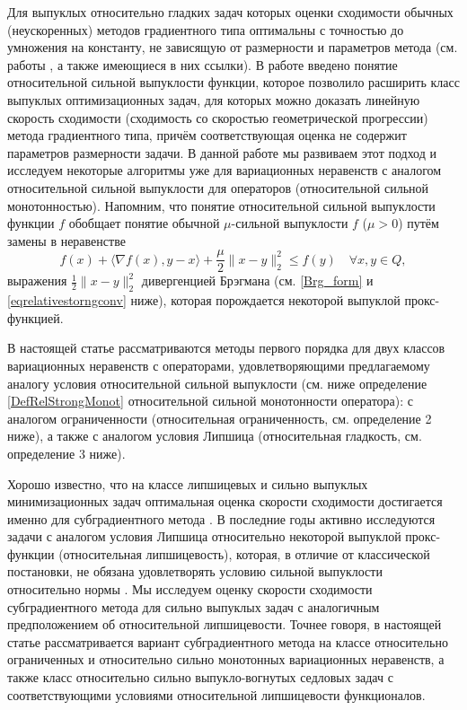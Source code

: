     Для выпуклых относительно гладких задач которых оценки сходимости обычных (неускоренных) методов градиентного типа оптимальны с точностью до умножения на константу, не зависящую от размерности и параметров метода (см. работы \cite{Bauschke,Drag,Dragomir,Lu_Nesterov_2018}, а также имеющиеся в них ссылки). В работе \cite{Lu_Nesterov_2018} введено понятие относительной сильной выпуклости функции, которое позволило расширить класс выпуклых оптимизационных задач, для которых можно доказать линейную скорость сходимости (сходимость со скоростью геометрической прогрессии) метода градиентного типа, причём соответствующая оценка не содержит параметров размерности задачи. В данной работе мы развиваем этот подход и исследуем некоторые алгоритмы уже для вариационных неравенств с аналогом относительной сильной выпуклости для операторов (относительной сильной монотонностью). Напомним, что понятие относительной сильной выпуклости \cite{Lu_Nesterov_2018} функции $f$ обобщает понятие обычной $\mu$-сильной выпуклости $f$ ($\mu > 0$) путём замены в неравенстве 
    \begin{equation}
    	f(x) + \langle \nabla{f(x)}, y - x \rangle  + \frac{\mu}{2} \|x - y \|_2^2 \leq f(y) \quad   \forall x, y \in Q,
    	\end{equation}
    выражения $\frac{1}{2} \|x - y \|_2^2 $ дивергенцией Брэгмана (см. \eqref{Brg_form} и \eqref{eqrelativestorngconv} ниже), которая порождается некоторой выпуклой прокс-функцией. 

    В настоящей статье рассматриваются методы первого порядка для двух классов вариационных неравенств с операторами, удовлетворяющими предлагаемому аналогу условия относительной сильной выпуклости (см. ниже определение  \ref{DefRelStrongMonot} относительной сильной монотонности оператора): с аналогом ограниченности (относительная ограниченность, см. определение 2 ниже), а также с аналогом условия Липшица (относительная гладкость, см. определение 3 ниже).

    Хорошо известно, что на классе липшицевых и сильно выпуклых минимизационных задач оптимальная оценка скорости сходимости достигается именно для субградиентного метода \cite{Bach_2012}. В последние годы активно исследуются задачи с аналогом условия Липшица относительно некоторой выпуклой прокс-функции (относительная липшицевость), которая, в отличие от классической постановки, не обязана удовлетворять условию сильной выпуклости относительно нормы \cite{AdaMirr_2021,Lu_2018,Zhou_NIPS_2020}. Мы исследуем оценку скорости сходимости субградиентного метода для сильно выпуклых задач с аналогичным предположением об относительной липшицевости. Точнее говоря, в настоящей статье рассматривается вариант субградиентного метода на классе относительно ограниченных и относительно сильно монотонных вариационных неравенств, а также класс относительно сильно выпукло-вогнутых седловых задач с соответствующими условиями относительной липшицевости функционалов. 

